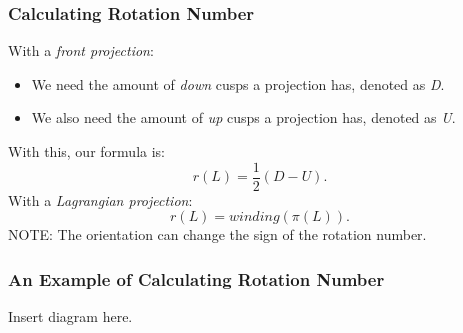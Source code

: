 \documentclass{beamer}
\begin{document}
\begin{frame}
    \frametitle{Calculating Rotation Number}
    With a \textit{front projection}:
    \begin{itemize}
        \item{We need the amount of \textit{down} cusps a projection has, denoted
        as \textit{D}.}
      \item{We also need the amount of \textit{up} cusps a projection has,
      denoted as \textit{U}.}
    \end{itemize}
    With this, our formula is:
    \[r(L) = \frac{1}{2}(D - U).\]
    With a \textit{Lagrangian projection}:
    \[r(L) = winding(\pi(L)).\]
    \alert{NOTE}: The orientation can change the sign of the rotation number.
\end{frame}

\begin{frame}
    \frametitle{An Example of Calculating Rotation Number}
    Insert diagram here.
\end{frame}


     
    
\end{document}
